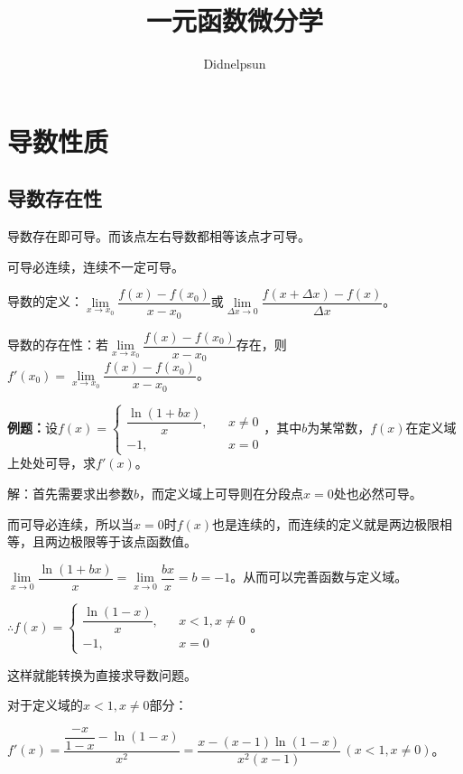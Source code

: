 \documentclass[UTF8, 12pt]{ctexart}
\author{Didnelpsun}
\title{一元函数微分学}
\date{}
\begin{document}
\maketitle
\pagestyle{empty}
\thispagestyle{empty}
\tableofcontents
\thispagestyle{empty}
\newpage
\pagestyle{plain}
\setcounter{page}{1}
\section{导数性质}

\subsection{导数存在性}

导数存在即可导。而该点左右导数都相等该点才可导。

可导必连续，连续不一定可导。

导数的定义：$\lim\limits_{x\to x_0}\dfrac{f(x)-f(x_0)}{x-x_0}$或$\lim\limits_{\Delta x\to 0}\dfrac{f(x+\Delta x)-f(x)}{\Delta x}$。

导数的存在性：若$\lim\limits_{x\to x_0}\dfrac{f(x)-f(x_0)}{x-x_0}$存在，则$f'(x_0)=\lim\limits_{x\to x_0}\dfrac{f(x)-f(x_0)}{x-x_0}$。\medskip

\textbf{例题：}设$f(x)=\left\{\begin{array}{lcl}
    \dfrac{\ln(1+bx)}{x}, & & x\neq 0 \\
    -1, & & x=0
\end{array}
\right.$，其中$b$为某常数，$f(x)$在定义域上处处可导，求$f'(x)$。

解：首先需要求出参数$b$，而定义域上可导则在分段点$x=0$处也必然可导。

而可导必连续，所以当$x=0$时$f(x)$也是连续的，而连续的定义就是两边极限相等，且两边极限等于该点函数值。\medskip

$\lim\limits_{x\to 0}\dfrac{\ln(1+bx)}{x}=\lim\limits_{x\to 0}\dfrac{bx}{x}=b=-1$。从而可以完善函数与定义域。\medskip

$\therefore f(x)=\left\{\begin{array}{lcl}
    \dfrac{\ln(1-x)}{x}, & & x<1,x\neq 0 \\
    -1, & & x=0
\end{array}
\right.$。

这样就能转换为直接求导数问题。

对于定义域的$x<1,x\neq 0$部分：\medskip

$f'(x)=\dfrac{\dfrac{-x}{1-x}-\ln(1-x)}{x^2}=\dfrac{x-(x-1)\ln(1-x)}{x^2(x-1)}\,(x<1,x\neq 0)$。
\end{document}
